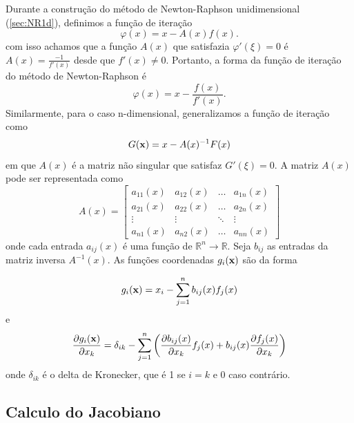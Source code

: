 Durante a construção do método de Newton-Raphson unidimensional (\ref{sec:NR1d}), definimos a função de iteração 
\begin{equation*}
\varphi(x) = x - {A(x)}{f(x)}.
\end{equation*}
com isso achamos que a função \(A(x)\) que satisfazia \(\varphi'(\xi) = 0\) é \(A(x) = \frac{-1}{f'(x)}\) desde que \(f'(x) \neq 0\). Portanto, a forma da função de iteração do método de Newton-Raphson é
\begin{equation*}
    \varphi(x) = x - \frac{f(x)}{f'(x)}. 
\end{equation*}
Similarmente, para o caso n-dimensional, generalizamos a função de iteração como
\begin{equation*}
    G(\textbf{x}) = x - A(x)^{-1} F(x)
\end{equation*}
em que \(A(x)\) é a matriz não singular que satisfaz \(G'(\xi) = 0\). A matriz \(A(x)\) pode ser representada como
\begin{equation}\label{matA}
    A(x) =  
    \begin{bmatrix}
        a_{11}(x) & a_{12}(x) & \ldots & a_{1n}(x) \\
        a_{21}(x) & a_{22}(x) & \ldots & a_{2n}(x) \\
        \vdots & \vdots & \ddots & \vdots \\
        a_{n1}(x) & a_{n2}(x) & \ldots & a_{nn}(x)
    \end{bmatrix}
\end{equation}
onde cada entrada  \(a_{ij}(x)\) é uma função de   \(\mathbb{R}^n \rightarrow  \mathbb{R}\). Seja \(b_{ij}\) as entradas da matriz inversa \(A^{-1}(x)\). As funções coordenadas  $g_{i}(\textbf{x})$ são da forma

\begin{equation}
    g_{i}(\textbf{x}) = x_i - \sum_{j=1}^{n} b_{ij}(x) f_j(x)
\end{equation}
e
\begin{equation}\label{sumInvA}
    \frac{\partial g_i(\textbf{x})}{\partial x_k} = \delta_{ik} - \sum_{j=1}^{n} \left( \frac{\partial b_{ij}(x)}{\partial x_k} f_j(x) + b_{ij}(x) \frac{\partial f_j(x)}{\partial x_k} \right)
\end{equation}
onde \(\delta_{ik}\) é o delta de Kronecker, que é 1 se \(i = k\) e 0 caso contrário.

\subsection{Calculo do Jacobiano}

